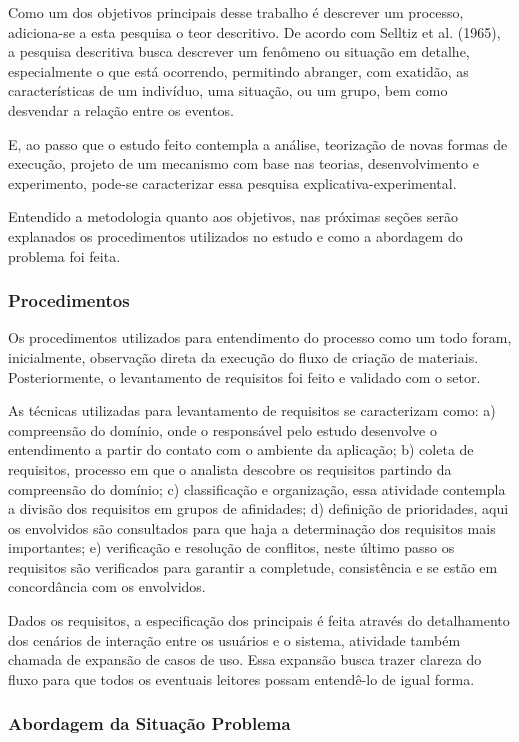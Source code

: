Como um dos objetivos principais desse trabalho é descrever um processo, adiciona-se a esta pesquisa o teor descritivo. De acordo com Selltiz et al. (1965), a pesquisa descritiva busca descrever um fenômeno ou situação em detalhe, especialmente o que está ocorrendo, permitindo abranger, com exatidão, as características de um indivíduo, uma situação, ou um grupo, bem como desvendar a relação entre os eventos. 

E, ao passo que o estudo feito contempla a análise, teorização de novas formas de execução, projeto de um mecanismo com base nas teorias, desenvolvimento e experimento, pode-se caracterizar essa pesquisa explicativa-experimental.

Entendido a metodologia quanto aos objetivos, nas próximas seções serão explanados os procedimentos utilizados no estudo e como a abordagem do problema foi feita.

\subsubsection{Procedimentos}

Os procedimentos utilizados para entendimento do processo como um todo foram, inicialmente, observação direta da execução do fluxo de criação de materiais. Posteriormente, o levantamento de requisitos foi feito e validado com o setor.

As técnicas utilizadas para levantamento de requisitos se caracterizam como: a) compreensão do domínio, onde o responsável pelo estudo desenvolve o entendimento a partir do contato com o ambiente da aplicação; b) coleta de requisitos, processo em que o analista descobre os requisitos partindo da compreensão do domínio; c) classificação e organização, essa atividade contempla a divisão dos requisitos em grupos de afinidades; d) definição de prioridades, aqui os envolvidos são consultados para que haja a determinação dos requisitos mais importantes; e) verificação e resolução de conflitos, neste último passo os requisitos são verificados para garantir a completude, consistência e se estão em concordância com os envolvidos.

Dados os requisitos, a especificação dos principais é feita através do detalhamento dos cenários de interação entre os usuários e o sistema, atividade também chamada de expansão de casos de uso. Essa expansão busca trazer clareza do fluxo para que todos os eventuais leitores possam entendê-lo de igual forma.

\subsubsection{Abordagem da Situação Problema}

